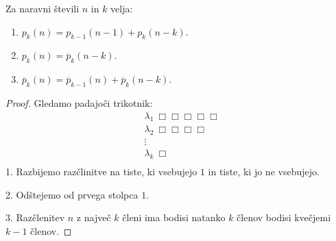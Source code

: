 \begin{trditev}
    Za naravni števili $n$ in $k$ velja:
    \begin{enumerate}
        \item $p_k(n) = p_{k-1}(n-1) + p_k(n-k)$.
        \item $p_k(n) = \overline{p}_k(n-k)$.
        \item $\overline{p}_k(n) = \overline{p}_{k-1}(n) + \overline{p}_k(n-k)$.
    \end{enumerate}
\end{trditev}

\begin{proof}
    Gledamo padajoči trikotnik:
    \begin{align*}
        &\lambda_1 \ \Box \Box \Box \Box \Box \\
        &\lambda_2  \  \Box \Box \Box \Box  \\
        &\vdots  \\
        &\lambda_k \ \Box  \\
    \end{align*}
    1. Razbijemo razčlinitve na tiste, ki vsebujejo $1$ in tiste, ki jo ne vsebujejo.
    
    2. Odštejemo od prvega stolpca $1$.

    3. Razčlenitev $n$ z največ $k$ členi ima bodisi natanko $k$ členov bodisi kvečjemi $k-1$ členov.
\end{proof}
